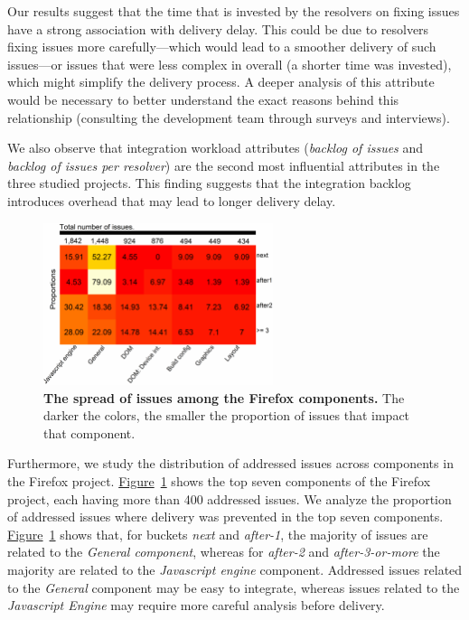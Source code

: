 Our results suggest that the time that is invested by the resolvers on fixing
issues have a strong association with delivery delay. This could be due to
resolvers fixing issues more carefully---which would lead to a smoother
delivery of such issues---or issues that were less complex in overall (\eg a
shorter time was invested), which might simplify the delivery process. A deeper
analysis of this attribute would be necessary to better understand the exact
reasons behind this relationship (\eg consulting the development team through
surveys and interviews). 

We also observe that integration workload attributes (\ie \textit{backlog of
issues} and \textit{backlog of issues per resolver}) are the second most
influential attributes in the three studied projects. This finding suggests that
the integration backlog introduces overhead that may lead to longer delivery
delay.

\begin{figure}[!t]
	\centering
	\includegraphics[width=0.60\textwidth,keepaspectratio]
	{chapters/chapter4/figures/firefox/RQ3_component_hm.pdf}
	\caption{\textbf{The spread of issues among the Firefox components.} The
		darker the colors, the smaller the proportion of issues that
	impact that component.}
	\label{ch4:fig:componentHeatmap}
\end{figure}

Furthermore, we study the distribution of addressed issues across components in the
Firefox project.
\hyperref[ch4:fig:componentHeatmap]{Figure}~\ref{ch4:fig:componentHeatmap} shows the top
seven components of the Firefox project, each having more than 400 addressed issues.
We analyze the proportion of addressed issues where delivery was prevented in the
top seven components.
\hyperref[ch4:fig:componentHeatmap]{Figure}~\ref{ch4:fig:componentHeatmap} shows that,
for buckets \textit{next} and \textit{after-1}, the majority of issues are
related to the \textit{General component}, whereas for \textit{after-2} and
\textit{after-3-or-more} the majority are related to the \textit{Javascript
engine} component. Addressed issues related to the \textit{General} component
may be easy to integrate, whereas issues related to the \textit{Javascript
Engine} may require more careful analysis before delivery.  \\


